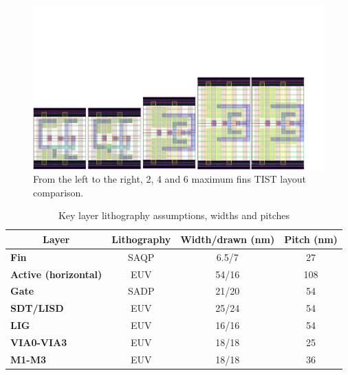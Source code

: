\documentclass[diss,pgmicro,english]{iiufrgs}
\begin{document}
\begin{figure}[]
\centering
\includegraphics[width=1.5\textwidth, trim={0cm 0cm 2cm 8cm},clip, angle=90]{TISTComp.pdf}
\caption{From the left to the right, 2, 4 and 6 maximum fins TIST layout comparison.}
\label{fig:tistComp}
\end{figure}

\begin{table}[]
\centering
\caption{Key layer lithography assumptions, widths and pitches}
\label{layers}
\begin{tabular}{lccc}
\hline
\multicolumn{1}{c}{\textbf{Layer}} & \textbf{Lithography} & \textbf{Width/drawn (nm)} & \textbf{Pitch (nm)} \\ \hline
\textbf{Fin}                         & SAQP                 & 6.5/7                     & 27                  \\ \hline
\textbf{Active (horizontal)}         & EUV                  & 54/16                     & 108                 \\ \hline
\textbf{Gate}                        & SADP                 & 21/20                     & 54                  \\ \hline
\textbf{SDT/LISD}                    & EUV                  & 25/24                     & 54                  \\ \hline
\textbf{LIG}                         & EUV                  & 16/16                     & 54                  \\ \hline
\textbf{VIA0-VIA3}                   & EUV                  & 18/18                     & 25                  \\ \hline
\textbf{M1-M3}                       & EUV                  & 18/18                     & 36                  \\ \hline
\end{tabular}
\end{table}
\end{document}

